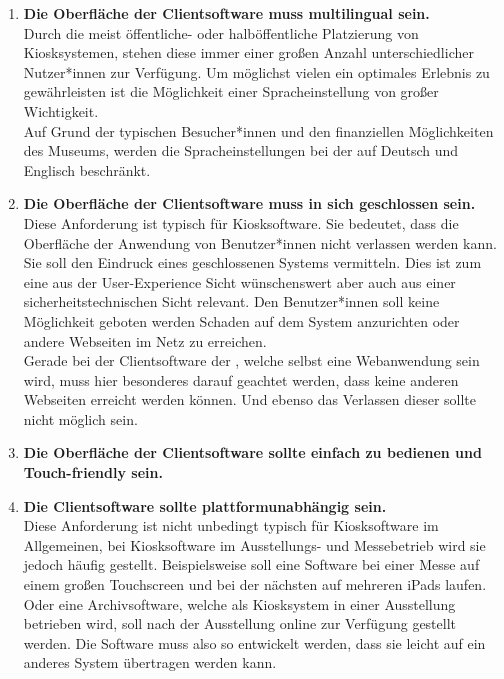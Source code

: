 \begin{enumerate}[label=\textbf{NFA\arabic*}]
  \item\label{nfa3} \textbf{Die Oberfläche der Clientsoftware muss multilingual sein.}\\
  Durch die meist öffentliche- oder halböffentliche Platzierung von Kiosksystemen, stehen diese
  immer einer großen Anzahl unterschiedlicher Nutzer*innen zur Verfügung. Um möglichst vielen
  ein optimales Erlebnis zu gewährleisten ist die Möglichkeit einer Spracheinstellung von großer Wichtigkeit.\\
  Auf Grund der typischen Besucher*innen und den finanziellen Möglichkeiten des Museums, werden die 
  Spracheinstellungen bei der \shst{} auf Deutsch und Englisch beschränkt.
  \item\label{nfa4} \textbf{Die Oberfläche der Clientsoftware muss in sich geschlossen sein.}\\
  Diese Anforderung ist typisch für Kiosksoftware. Sie bedeutet, dass die Oberfläche der Anwendung von Benutzer*innen 
  nicht verlassen werden kann. Sie soll den Eindruck eines geschlossenen Systems vermitteln. Dies ist zum eine
  aus der User-Experience Sicht wünschenswert aber auch aus einer sicherheitstechnischen Sicht relevant. Den 
  Benutzer*innen soll keine Möglichkeit geboten werden Schaden auf dem System anzurichten oder andere Webseiten
  im Netz zu erreichen.\\
  Gerade bei der Clientsoftware der \shst{}, welche selbst eine Webanwendung sein wird, muss hier besonderes darauf
  geachtet werden, dass keine anderen Webseiten erreicht werden können. Und ebenso das Verlassen dieser sollte
  nicht möglich sein. 
  \item\label{nfa5} \textbf{Die Oberfläche der Clientsoftware sollte einfach zu bedienen und Touch-friendly sein.}\\
  \item\label{nfa6} \textbf{Die Clientsoftware sollte plattformunabhängig sein.}\\
  Diese Anforderung ist nicht unbedingt typisch für Kiosksoftware im Allgemeinen, bei Kiosksoftware im Ausstellungs- und
  Messebetrieb wird sie jedoch häufig gestellt. Beispielsweise soll eine Software bei einer Messe auf einem
  großen Touchscreen und bei der nächsten auf mehreren iPads laufen. Oder eine Archivsoftware, welche als Kiosksystem
  in einer Ausstellung betrieben wird, soll nach der Ausstellung online zur Verfügung gestellt werden. Die Software
  muss also so entwickelt werden, dass sie leicht auf ein anderes System übertragen werden kann. \\ 

\end{enumerate}
